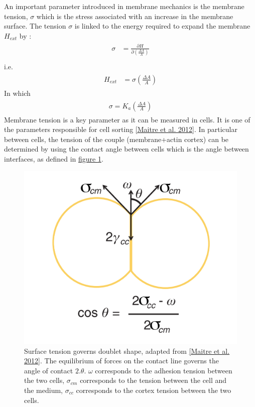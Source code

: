 \documentclass[A4paperpaper,11pt,english]{sphinxmanual}
\begin{document}
An important parameter introduced in membrane mechanics is the  membrane tension,
\(\sigma\) which is the stress associated with an increase in the membrane surface.
The tension \(\sigma\) is linked to the energy required to expand the membrane \(H_{ext}\) by :
\label{index-latex:equation-eqa4}\begin{gather}
\begin{split}\sigma &= \frac {\partial H} {\partial \left(\frac{\Delta A}{A}\right)} \\\end{split}\label{index-latex-eqa4}
\end{gather}
i.e.
\label{index-latex:equation-eqa5}\begin{gather}
\begin{split}H_{ext} &= \sigma\left( \frac {\Delta A} A \right)\end{split}\label{index-latex-eqa5}
\end{gather}
In which
\label{index-latex:equation-eqa6a}\begin{gather}
\begin{split}\sigma =  K_a \left( \frac {\Delta A} A \right)\end{split}\label{index-latex-eqa6a}
\end{gather}
Membrane tension is a key parameter as it can be measured in cells. It is one
of the parameters responsible for cell sorting {\hyperref[index-latex:maitre2012]{{[}Maitre et al. 2012{]}}}. In particular
between cells, the tension of the couple (membrane+actin cortex) can be
determined by using the contact angle between cells which is the angle between
interfaces, as defined in \hyperref[index-latex:fig-tension-cell]{figure  \ref*{index-latex:fig-tension-cell}}.
\begin{figure}[htbp]
\centering
\capstart

\includegraphics[width=0.400\linewidth]{Cell-Surface-tension.png}
\caption{Surface tension governs doublet shape,  adapted from {\hyperref[index-latex:maitre2012]{{[}Maitre et al. 2012{]}}}.
The equilibrium of forces on the contact line governs the angle of contact
\(2.\theta\). \(\omega\) corresponds to the adhesion tension between
the two cells, \(\sigma_{cm}\) corresponds  to the tension between
the cell and the medium, \(\sigma_{cc}\) corresponds to the cortex
tension between the two cells.}\label{index-latex:fig-tension-cell}\end{figure}
\end{document}
